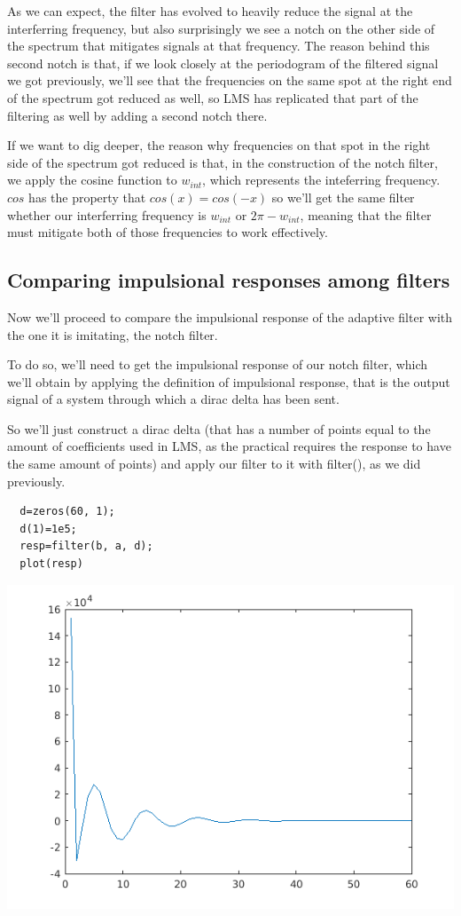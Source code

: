 \documentclass[conference,9pt]{IEEEtran}
\begin{document}
As we can expect, the filter has evolved to heavily reduce the signal at the interferring frequency, but also surprisingly we see a notch on the other side of the spectrum that mitigates signals at that frequency. The reason behind this second notch is that, if we look closely at the periodogram of the filtered signal we got previously, we'll see that the frequencies on the same spot at the right end of the spectrum got reduced as well, so LMS has replicated that part of the filtering as well by adding a second notch there.

If we want to dig deeper, the reason why frequencies on that spot in the right side of the spectrum got reduced is that, in the construction of the notch filter, we apply the cosine function to $w_{int}$, which represents the inteferring frequency. $cos$ has the property that $cos(x)=cos(-x)$ so we'll get the same filter whether our interferring frequency is $w_{int}$ or $2\pi-w_{int}$, meaning that the filter must mitigate both of those frequencies to work effectively.

\subsection{Comparing impulsional responses among filters}
Now we'll proceed to compare the impulsional response of the adaptive filter with the one it is imitating, the notch filter.

To do so, we'll need to get the impulsional response of our notch filter, which we'll obtain by applying the definition of impulsional response, that is the output signal of a system through which a dirac delta has been sent.

So we'll just construct a dirac delta (that has a number of points equal to the amount of coefficients used in LMS, as the practical requires the response to have the same amount of points) and apply our filter to it with filter(), as we did previously.

\begin{verbatim}
  d=zeros(60, 1);
  d(1)=1e5;
  resp=filter(b, a, d);
  plot(resp)
\end{verbatim}

\includegraphics[scale=0.6]{imp-resp.png}
\end{document}
